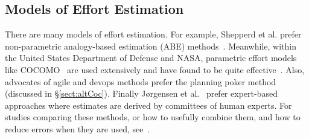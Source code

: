 \documentclass[final,twocolumn]{elsarticle}
\newcommand{\etal}{et al.}
\newcommand{\tion}[1]{\S\ref{sect:#1}}
\theoremstyle{break}
\begin{document}

  \subsection{Models of Effort Estimation}\label{sect:emodels}
  There are many models of effort estimation.
   For example, Shepperd et
 al. prefer non-parametric analogy-based estimation (ABE)
 methods~\cite{shepperd1997estimating}.  Meanwhile, within the
 United States Department of Defense and NASA,
 parametric effort models like
 COCOMO~\cite{boehm81} are used extensively and
 have found to be quite effective~\cite{lum02}.
 Also, advocates of agile and devops methods prefer
 the planning poker method (discussed in \tion{altCoc}).
 Finally J{\o}rgensen  et al.~\cite{jorgensen09} prefer
 expert-based approaches where estimates are derived
 by committees of human experts.  For studies
 comparing these methods, or how to usefully combine
 them, and how to reduce errors when they are used,
 see~\cite{koc11b,Minku2013,garg15,me13a}.

 
 
\end{document}
